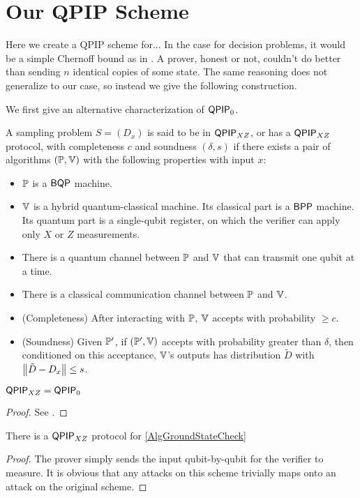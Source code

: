 \section{Our QPIP Scheme}

Here we create a QPIP scheme for...  In the case for decision problems, it would be a simple Chernoff bound as in \cite{kitaev2002classical}. A prover, honest or not, couldn't do better than sending $n$ identical copies of some state. The same reasoning does not generalize to our case, so instead we give the following construction.

We first give an alternative characterization of $\operatorname{\mathsf{QPIP}}_0$.

\begin{definition}
	A sampling problem $S=(D_x)$ is said to be in $\operatorname{\mathsf{QPIP}}_{XZ}$, or has a $\operatorname{\mathsf{QPIP}}_{XZ}$ protocol,  with completeness $c$ and soundness $(\delta, s)$ if there exists a pair of algorithms $(\mathbb{P}, \mathbb{V})$ with the following properties with input $x$:
	\begin{itemize}
		\item $\mathbb{P}$ is a $\operatorname{\mathsf{BQP}}$ machine.
		\item $\mathbb{V}$ is a hybrid quantum-classical machine. Its classical part is a $\operatorname{\mathsf{BPP}}$ machine. Its quantum part is a single-qubit register, on which the verifier can apply only $X$ or $Z$ measurements.
		\item There is a quantum channel between $\mathbb{P}$ and $\mathbb{V}$ that can transmit one qubit at a time.
		\item There is a classical communication channel between $\mathbb{P}$ and $\mathbb{V}$.
		\item (Completeness) After interacting with $\mathbb{P}$, $\mathbb{V}$ accepts with probability $\geq c$.
		\item (Soundness) Given $\mathbb{P}'$, if $(\mathbb{P}', \mathbb{V})$ accepts with probability greater than $\delta$, then conditioned on this acceptance, $\mathbb{V}$'s outputs has distribution $\tilde{D}$ with $\left\lVert\tilde{D}-D_x\right\rVert\leq s$.
	\end{itemize}
\end{definition}

\begin{theorem}
	$\operatorname{\mathsf{QPIP}}_{XZ}=\operatorname{\mathsf{QPIP}}_0$
\end{theorem}
\begin{proof}
	See \cite{mahadev_delegation}.
\end{proof}

\begin{theorem}
	There is a $\operatorname{\mathsf{QPIP}}_{XZ}$ protocol for \autoref{AlgGroundStateCheck}
\end{theorem}
\begin{proof}
	The prover simply sends the input qubit-by-qubit for the verifier to measure. It is obvious that any attacks on this scheme trivially maps onto an attack on the original scheme.
\end{proof}

